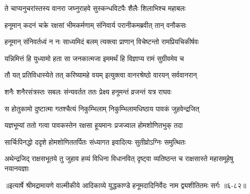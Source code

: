 \twolineshloka
{ते चाप्यनुचरांस्तस्य वानरा जघ्नुराहवे}
{सुस्कन्धविटपैः शैलैः शिलाभिश्च महाबलः} %

\twolineshloka
{हनूमान् कदनं चक्रे रक्षसां भीमकर्मणाम्}
{संनिवार्य परानीकमब्रवीत् तान् वनौकसः} %

\twolineshloka
{हनूमान् संनिवर्तध्वं न नः साध्यमिदं बलम्}
{त्यक्त्वा प्राणान् विचेष्टन्तो रामप्रियचिकीर्षवः} %

\twolineshloka
{यन्निमित्तं हि युध्यामो हता सा जनकात्मजा}
{इममर्थं हि विज्ञाप्य रामं सुग्रीवमेव च} %

\twolineshloka
{तौ यत् प्रतिविधास्येते तत् करिष्यामहे वयम्}
{इत्युक्त्वा वानरश्रेष्ठो वारयन् सर्ववानरान्} %

\twolineshloka
{शनैः शनैरसंत्रस्तः सबलः संन्यवर्तत}
{ततः प्रेक्ष्य हनूमन्तं व्रजन्तं यत्र राघवः} %

\twolineshloka
{स होतुकामो दुष्टात्मा गतश्चैत्यं निकुम्भिलाम्}
{निकुम्भिलामधिष्ठाय पावकं जुहवेन्द्रजित्} %

\twolineshloka
{यज्ञभूम्यां ततो गत्वा पावकस्तेन रक्षसा}
{हूयमानः प्रजज्वाल होमशोणितभुक् तदा} %

\twolineshloka
{सार्चिःपिनद्धो ददृशे होमशोणिततर्पितः}
{संध्यागत इवादित्यः सुतीव्रोऽग्निः समुत्थितः} %

\twolineshloka
{अथेन्द्रजिद् राक्षसभूतये तु जुहाव हव्यं विधिना विधानवित्}
{दृष्ट्वा व्यतिष्ठन्त च राक्षसास्ते महासमूहेषु नयानयज्ञाः} %


॥इत्यार्षे श्रीमद्रामायणे वाल्मीकीये आदिकाव्ये युद्धकाण्डे हनूमदादिनिर्वेदः नाम द्व्यशीतितमः सर्गः ॥६-८२॥
